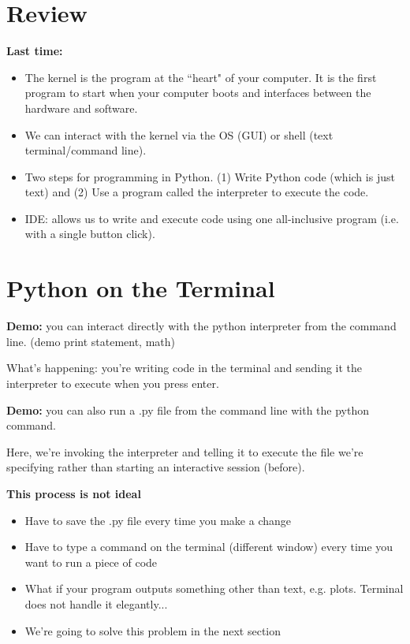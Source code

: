 \documentclass[12pt]{article}
\numberwithin{equation}{section}
\begin{document}
\section{Review}

\textbf{Last time:}
\begin{itemize}
    \item The kernel is the program at the ``heart" of your computer. It is the first program to start when your computer boots and interfaces between the hardware and software.
    \item We can interact with the kernel via the OS (GUI) or shell (text terminal/command line).
    \item Two steps for programming in Python. (1) Write Python code (which is just text) and (2) Use a program called the interpreter to execute the code.
    \item IDE: allows us to write and execute code using one all-inclusive program (i.e. with a single button click).
\end{itemize}

\section{Python on the Terminal}
\textbf{Demo:} you can interact directly with the python interpreter from the command line. (demo print statement, math)

What's happening: you're writing code in the terminal and sending it the interpreter to execute when you press enter.

\textbf{Demo:} you can also run a .py file from the command line with the python command. 

Here, we're invoking the interpreter and telling it to execute the file we're specifying rather than starting an interactive session (before).

\textbf{This process is not ideal}

\begin{itemize}
    \item Have to save the .py file every time you make a change
    \item Have to type a command on the terminal (different window) every time you want to run a piece of code
    \item What if your program outputs something other than text, e.g. plots. Terminal does not handle it elegantly...
    \item We're going to solve this problem in the next section
\end{itemize}
\end{document}
